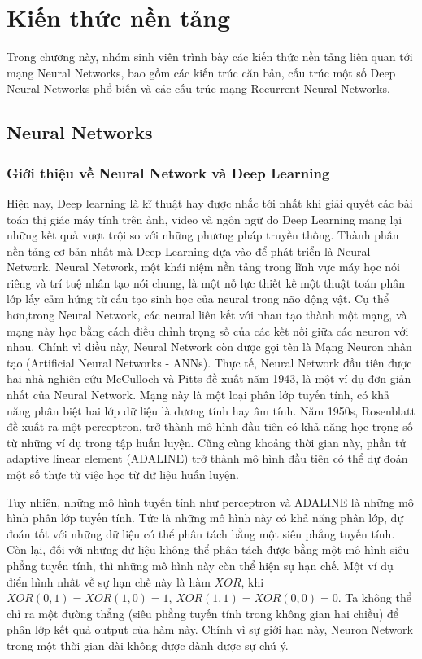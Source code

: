 \chapter{Kiến thức nền tảng}
\label{chap-background}
\begin{ChapAbstract}
Trong chương này, nhóm sinh viên trình bày các kiến thức nền tảng liên quan tới mạng Neural Networks, bao gồm các kiến trúc căn bản, cấu trúc một số Deep Neural Networks phổ biến và các cấu trúc mạng Recurrent Neural Networks.
\end{ChapAbstract}

\section{Neural Networks}
\subsection{Giới thiệu về Neural Network và Deep Learning}
Hiện nay, Deep learning là kĩ thuật hay được nhắc tới nhất khi giải quyết các bài toán thị giác máy tính trên ảnh, video và ngôn ngữ do Deep Learning mang lại những kết quả vượt trội so với những phương pháp truyền thống. Thành phần nền tảng cơ bản nhất mà Deep Learning dựa vào để phát triển là Neural Network. Neural Network, một khái niệm nền tảng trong lĩnh vực máy học nói riêng và trí tuệ nhân tạo nói chung, là một nỗ lực thiết kế một thuật toán phân lớp lấy cảm hứng từ cấu tạo sinh học của neural trong não động vật. Cụ thể hơn,trong Neural Network, các neural liên kết với nhau tạo thành một mạng, và mạng này học bằng cách điều chỉnh trọng số của các kết nối giữa các neuron với nhau. Chính vì điều này, Neural Network còn được gọi tên là Mạng Neuron nhân tạo (Artificial Neural Networks - ANNs). Thực tế, Neural Network đầu tiên được hai nhà nghiên cứu McCulloch và Pitts đề xuất năm 1943, là một ví dụ đơn giản nhất của Neural Network. Mạng này là một loại phân lớp tuyến tính, có khả năng phân biệt hai lớp dữ liệu là dương tính hay âm tính. Năm 1950s, Rosenblatt đề xuất ra một perceptron, trở thành mô hình đầu tiên có khả năng học trọng số từ những ví dụ trong tập huấn luyện. Cũng cùng khoảng thời gian này, phần tử adaptive linear element (ADALINE) trở thành mô hình đầu tiên có thể dự đoán một số thực từ việc học từ dữ liệu huấn luyện.

Tuy nhiên, những mô hình tuyến tính như perceptron và ADALINE là những mô hình phân lớp tuyến tính. Tức là những mô hình này có khả năng phân lớp, dự đoán tốt với những dữ liệu có thể phân tách bằng một siêu phẳng tuyến tính. Còn lại, đối với những dữ liệu không thể phân tách được bằng một mô hình siêu phẳng tuyến tính, thì những mô hình này còn thể hiện sự hạn chế. Một ví dụ điển hình nhất về sự hạn chế này là hàm $XOR$, khi $ XOR(0,1) = XOR(1,0) = 1 $, $XOR(1,1) = XOR(0,0) = 0$. Ta không thể chỉ ra một đường thẳng (siêu phẳng tuyến tính trong không gian hai chiều) để phân lớp kết quả output của hàm này. Chính vì sự giới hạn này, Neuron Network trong một thời gian dài không được dành được sự chú ý. 

